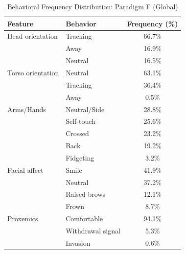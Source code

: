 \begin{table}[ht]
\centering
\caption{Behavioral Frequency Distribution: Paradigm F (Global)}
\begin{tabular}{llc}
\toprule
Feature & Behavior & Frequency (\%) \\
\midrule
Head orientation & Tracking & 66.7\% \\
 & Away & 16.9\% \\
 & Neutral & 16.5\% \\
Torso orientation & Neutral & 63.1\% \\
 & Tracking & 36.4\% \\
 & Away & 0.5\% \\
Arms/Hands & Neutral/Side & 28.8\% \\
 & Self-touch & 25.6\% \\
 & Crossed & 23.2\% \\
 & Back & 19.2\% \\
 & Fidgeting & 3.2\% \\
Facial affect & Smile & 41.9\% \\
 & Neutral & 37.2\% \\
 & Raised brows & 12.1\% \\
 & Frown & 8.7\% \\
Proxemics & Comfortable & 94.1\% \\
 & Withdrawal signal & 5.3\% \\
 & Invasion & 0.6\% \\
\bottomrule
\end{tabular}
\end{table}